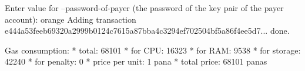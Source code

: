 \begin{shellbox}\begin{ttlst}
Enter value for --password-of-payer (the password of the key pair of the payer account): orange
Adding transaction e444a53feeb69320a2999b0124c7615a87bba4c3294ef702504bf5a86f4ee5d7... done.

Gas consumption:
 * total: 68101
   * for CPU: 16323
   * for RAM: 9538
   * for storage: 42240
   * for penalty: 0
 * price per unit: 1 pana
 * total price: 68101 panas
\end{ttlst}\end{shellbox}
